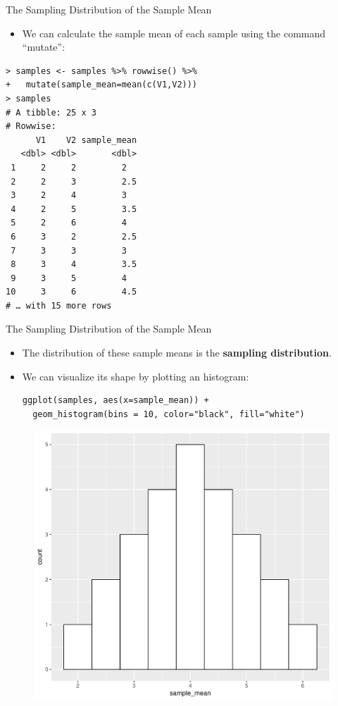 \documentclass[handout]{beamer}
\begin{document}
\begin{frame}[fragile]{The Sampling Distribution of the Sample Mean}
\scriptsize{
\begin{itemize}
\item We can calculate the sample mean of each sample using the command ``mutate'':
\end{itemize}

\begin{verbatim}
> samples <- samples %>% rowwise() %>% 
+   mutate(sample_mean=mean(c(V1,V2)))
> samples
# A tibble: 25 x 3
# Rowwise: 
      V1    V2 sample_mean
   <dbl> <dbl>       <dbl>
 1     2     2         2  
 2     2     3         2.5
 3     2     4         3  
 4     2     5         3.5
 5     2     6         4  
 6     3     2         2.5
 7     3     3         3  
 8     3     4         3.5
 9     3     5         4  
10     3     6         4.5
# … with 15 more rows
\end{verbatim}



} 
\end{frame}



\begin{frame}[fragile]{The Sampling Distribution of the Sample Mean}
\scriptsize{
\begin{itemize}
\item The distribution of these sample means is the \textbf{sampling distribution}.
\item We can visualize its shape by plotting an histogram: 
\begin{verbatim}
ggplot(samples, aes(x=sample_mean)) + 
  geom_histogram(bins = 10, color="black", fill="white")
\end{verbatim}


\end{itemize}

\begin{figure}[h!]
	\centering
	\includegraphics[scale=0.35]{pics/hist_sampdist.pdf}
\end{figure}


} 
\end{frame}
\end{document}
